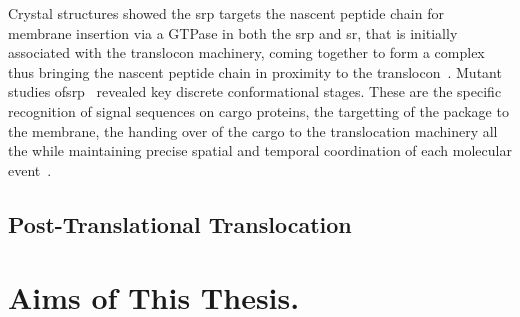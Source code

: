 Crystal structures showed the \gls{srp} targets the nascent peptide chain for membrane insertion via a GTPase in both the \gls{srp} and \gls{sr}, that is initially associated with the translocon machinery, coming together to form a complex thus bringing the nascent peptide chain in proximity to the translocon~\cite{Shan2005}.
Mutant studies of\gls{srp}~\cite{Shan2005} revealed key discrete conformational stages.
These are the specific recognition of signal sequences on cargo proteins, the targetting of the package to the membrane, the handing over of the cargo to the translocation machinery all the while maintaining precise spatial and temporal coordination of each molecular event~\cite{Saraogi2011}.


\subsection{Post-Translational Translocation}



\section{Aims of This Thesis.}
